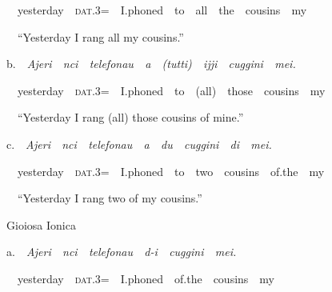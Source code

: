 \documentclass[output=paper,modfonts,nonflat]{langsci/langscibook}
\begin{document}
\begin{styleStandard}
\ \ \ \ yesterday\ \ \textsc{dat}.3=\ \ I.phoned\ \ to\ \ all\ \ the\ \ cousins\ \ my
\end{styleStandard}

\begin{styleStandard}
\ \ \ \ “Yesterday I rang all my cousins.”
\end{styleStandard}

\begin{styleStandard}
\ \ b.\ \ \textit{Ajeri\ \ nci\ \ telefonau\ \ a\ \ (tutti)\ \ ijji\ \ cuggini\ \ mei.}
\end{styleStandard}

\begin{styleStandard}
\ \ \ \ yesterday\ \ \textsc{dat}.3=\ \ I.phoned\ \ to\ \ (all)\ \ those\ \ cousins\ \ my
\end{styleStandard}

\begin{styleStandard}
\ \ \ \ “Yesterday I rang (all) those cousins of mine.”
\end{styleStandard}

\begin{styleStandard}
\ \ c.\ \ \textit{Ajeri\ \ nci\ \ telefonau\ \ a\ \ du\ \ cuggini\ \ di\ \ mei.}
\end{styleStandard}

\begin{styleStandard}
\ \ \ \ yesterday\ \ \textsc{dat}.3=\ \ I.phoned\ \ to\ \ two\ \ cousins\ \ of.the\ \ my
\end{styleStandard}

\begin{styleStandard}
\ \ \ \ “Yesterday I rang two of my cousins.”
\end{styleStandard}

\begin{listWWNumviiileveli}
\item 
\begin{styleListParagraph}
\ \ Gioiosa Ionica
\end{styleListParagraph}
\end{listWWNumviiileveli}
\begin{styleStandard}
\ \ a.\ \ \textit{Ajeri\ \ nci\ \ telefonau\ \ d-i\ \ cuggini\ \ mei.}
\end{styleStandard}

\begin{styleStandard}
\ \ \ \ yesterday\ \ \textsc{dat}.3=\ \ I.phoned\ \ of.the\ \ cousins\ \ my
\end{styleStandard}
\end{document}
